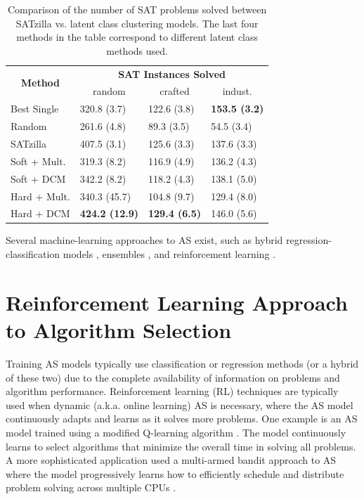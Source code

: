 \begin{table}[H]
	\centering
	\begin{tabular}{llll}
		\hline
		\multicolumn{1}{c}{\multirow{2}{*}{\textbf{Method}}} & \multicolumn{3}{c}{\textbf{SAT Instances Solved}} \\ \cline{2-4} 
		\multicolumn{1}{c}{} & \multicolumn{1}{c}{random} & \multicolumn{1}{c}{crafted} & \multicolumn{1}{c}{indust.} \\ \hline
		Best Single & 320.8 (3.7) & 122.6 (3.8) & \textbf{153.5 (3.2)} \\
		Random & 261.6 (4.8) & 89.3 (3.5) & 54.5 (3.4) \\
		SATzilla & 407.5 (3.1) & 125.6 (3.3) & 137.6 (3.3) \\
		Soft + Mult. & 319.3 (8.2) & 116.9 (4.9) & 136.2 (4.3) \\
		Soft + DCM & 342.2 (8.2) & 118.2 (4.3) & 138.1 (5.0) \\
		Hard + Mult. & 340.3 (45.7) & 104.8 (9.7) & 129.4 (8.0) \\
		Hard + DCM & \textbf{424.2 (12.9)} & \textbf{129.4 (6.5)} & 146.0 (5.6) \\ \hline
	\end{tabular}
	\caption[Comparison of the number of SAT problems solved between SATzilla vs. latent class clustering models]{Comparison of the number of SAT problems solved between SATzilla vs. latent class clustering models. The last four methods in the table correspond to different latent class methods used. \citep{silverthorn2010latent}}
	\label{tbl:satzilla}
\end{table}

Several machine-learning approaches to AS exist, such as hybrid regression-classification models \citep{kotthoff2012hybrid}, ensembles \citep{kotthoff2010ensemble}, and reinforcement learning \citep{lagoudakis2000algorithm}. 

\section{Reinforcement Learning Approach to Algorithm Selection}
Training AS models typically use classification or regression methods (or a hybrid of these two) due to the complete availability of information on problems and algorithm performance. Reinforcement learning (RL) techniques are typically used when dynamic (a.k.a. online learning) AS is necessary, where the AS model continuously adapts and learns as it solves more problems. One example is an AS model trained using a modified Q-learning algorithm \citep{lagoudakis2000algorithm}. The model continuously learns to select algorithms that minimize the overall time in solving all problems. A more sophisticated application used a multi-armed bandit approach to AS where the model progressively learns how to efficiently schedule and distribute problem solving across multiple CPUs \citep{gagliolo2009towards}.

